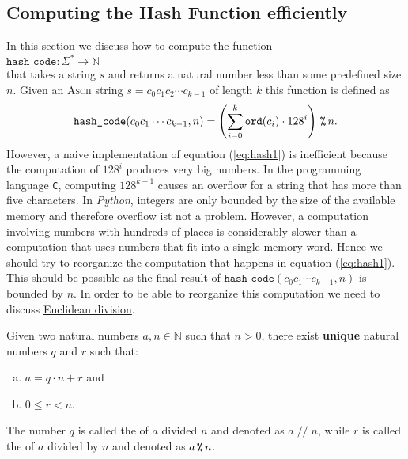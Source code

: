 \subsection{Computing the Hash Function efficiently}
In this section we discuss how to compute the function 
\\[0.2cm]
\hspace*{1.3cm}
$\texttt{hash\_code}:\Sigma^* \rightarrow \mathbb{N}$
\\[0.2cm]
that takes a string $s$ and returns a natural number less than some predefined size $n$.
Given an \textsc{Ascii} string $s = c_0 c_1 c_2 \cdots c_{k-1}$ of length $k$ this function is defined as
\begin{equation}
  \texttt{hash\_code}(c_0c_1\cdots c_{k-1}, n) = \left(\sum\limits_{i=0}^k \texttt{ord}(c_i) \cdot 128^i\right) \,\texttt{\%}\, n.
  \label{eq:hash1}
\end{equation}
However, a naive implementation of equation (\ref{eq:hash1}) is inefficient because the computation of $128^i$
produces very big numbers.  In the programming language \texttt{C}, computing $128^{k-1}$ causes an overflow for a
string that has more than five characters.  In \textsl{Python}, integers are only bounded by the size of the
available memory and therefore overflow ist not a problem.  However, a computation
involving numbers with hundreds of places is considerably slower than a computation that uses numbers that fit
into a single memory word. Hence we should try to reorganize the computation that happens in equation
(\ref{eq:hash1}).  This should be possible as the final result of $\texttt{hash\_code}(c_0c_1\cdots c_{k-1}, n)$
is bounded by $n$.  In order to be able to reorganize this computation we need to discuss
\href{https://en.wikipedia.org/wiki/Euclidean_division}{Euclidean division}.

\begin{Theorem}
  Given two natural numbers $a, n \in \mathbb{N}$ such that $n > 0$, there exist \textbf{unique} natural numbers 
  $q$ and $r$ such that:
  \begin{enumerate}[(a)]
  \item $a = q \cdot n + r$ \quad and
  \item $0 \leq r < n$.
  \end{enumerate}
  The number $q$ is called the  of $a$ divided $n$ and denoted as $a \;\texttt{//}\; n$, while
  $r$ is called the  of $a$ divided by $n$ and denoted as $a \,\texttt{\%}\, n$.  \eox
\end{Theorem}

